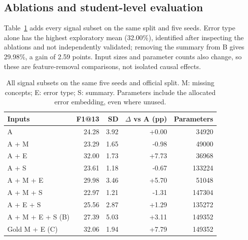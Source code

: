 \documentclass[11pt]{article}
\begin{document}
\subsection{Ablations and student-level evaluation}
Table~\ref{tab:ablations} adds every signal subset on the same split and five seeds.
Error type alone has the highest exploratory mean (32.00\%), identified after inspecting the ablations and not independently validated; removing the summary
from B gives 29.98\%, a gain of 2.59 points. Input sizes and parameter counts also
change, so these are feature-removal comparisons, not isolated causal effects.
\begin{table}[htbp]\centering\small
\caption{All signal subsets on the same five seeds and official split. M: missing concepts; E: error type; S: summary. Parameters include the allocated error embedding, even where unused.}\label{tab:ablations}
\begin{tabular}{@{}lrrrr@{}}\toprule
Inputs & F1@13 & SD & $\Delta$ vs A (pp) & Parameters\\\midrule
A & 24.28 & 3.92 & +0.00 & 34920\\
A + M & 23.29 & 1.65 & -0.98 & 49000\\
A + E & 32.00 & 1.73 & +7.73 & 36968\\
A + S & 23.61 & 1.18 & -0.67 & 133224\\
A + M + E & 29.98 & 3.46 & +5.70 & 51048\\
A + M + S & 22.97 & 1.21 & -1.31 & 147304\\
A + E + S & 25.56 & 2.87 & +1.29 & 135272\\
A + M + E + S (B) & 27.39 & 5.03 & +3.11 & 149352\\
Gold M + E (C) & 32.06 & 1.94 & +7.79 & 149352\\
\bottomrule\end{tabular}\end{table}
\end{document}

